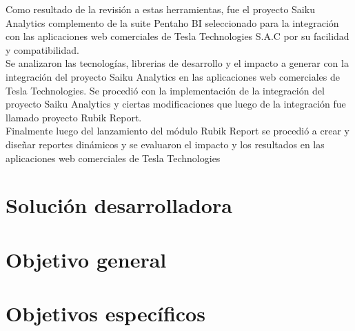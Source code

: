 \begin{spacing}{1.5}
	Como resultado de la revisión a estas herramientas, fue el proyecto Saiku Analytics complemento de la suite Pentaho BI seleccionado para la integración con las aplicaciones web comerciales de Tesla Technologies S.A.C por su facilidad y compatibilidad.\\
	Se analizaron las tecnologías, librerias de desarrollo y el impacto a generar  con la integración del proyecto Saiku Analytics en las aplicaciones web comerciales de Tesla Technologies.
	Se procedió con la implementación de la integración del proyecto Saiku Analytics y ciertas modificaciones que luego de la integración fue llamado proyecto Rubik Report.\\
	Finalmente luego del lanzamiento del módulo Rubik Report se procedió a crear y diseñar reportes dinámicos y se evaluaron el impacto y los resultados en las aplicaciones web comerciales de Tesla Technologies
\end{spacing}


\section{Soluci\'{o}n desarrolladora}
\begin{spacing}{1.5}
\end{spacing}
\section{Objetivo general}
\begin{spacing}{1.5}
\end{spacing}
\section{Objetivos espec\'{i}ficos}
\begin{spacing}{1.5}
\end{spacing}


	
